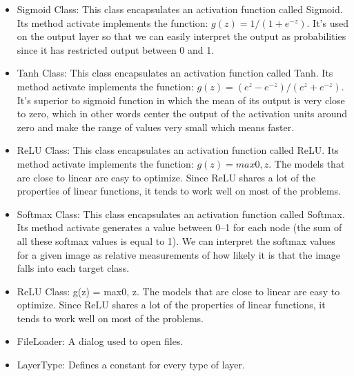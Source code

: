 \documentclass[parskip=full]{scrartcl}
\begin{document}
\begin{itemize}
\pagebreak



\begin{itemize}
	\item Sigmoid Class: This class encapsulates an activation function called Sigmoid. Its method activate implements the function: $g(z) = 1 / (1 + e^{-z})$. It’s used on the output layer so that we can easily interpret the output as probabilities since it has restricted output between 0 and 1.
	\item Tanh Class: This class encapsulates an activation function called Tanh. Its method activate implements the function: $g(z) = (e^z -e^{-z}) / (e^z + e^{-z})$. It’s superior to sigmoid function in which the mean of its output is very close to zero, which in other words center the output of the activation units around zero and make the range of values very small which means faster.
	\item ReLU Class: This class encapsulates an activation function called ReLU. Its method activate implements the function: $g(z) = max{0, z}$. The models that are close to linear are easy to optimize. Since ReLU shares a lot of the properties of linear functions, it tends to work well on most of the problems.
	\item Softmax Class: This class encapsulates an activation function called Softmax. Its method activate generates a value between 0–1 for each node (the sum of all these softmax values is equal to 1). We can interpret the softmax values for a given image as relative measurements of how likely it is that the image falls into each target class.
	\item ReLU Class:  g(z) = max{0, z}. The models that are close to linear are easy to optimize. Since ReLU shares a lot of the properties of linear functions, it tends to work well on most of the problems.
	\item FileLoader: A dialog used to open files.
	\item LayerType: Defines a constant for every type of layer.
\end{itemize}



\pagebreak




\end{itemize}
\end{document}
